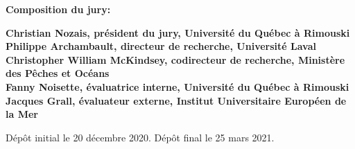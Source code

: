 \thispagestyle{empty}

\null
\vfill
\noindent \textbf{Composition du jury:}\\
\vspace{1cm}

\begin{singlespace}
  \noindent \textbf{Christian Nozais, président du jury, Université du Québec à Rimouski}\\

  \noindent \textbf{Philippe Archambault, directeur de recherche, Université Laval}\\

  \noindent \textbf{Christopher William McKindsey, codirecteur de recherche, Ministère des Pêches et Océans}\\

  \noindent \textbf{Fanny Noisette, évaluatrice interne, Université du Québec à Rimouski}\\

  \noindent \textbf{Jacques Grall, évaluateur externe, Institut Universitaire Européen de la Mer}\\
\end{singlespace}

\vspace{2cm}
\noindent Dépôt initial le 20 décembre 2020.
\hspace{3cm}
\noindent Dépôt final le 25 mars 2021.


\cleardoublepage
